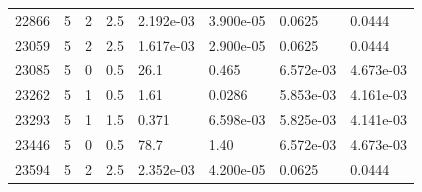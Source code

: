 \documentclass[preview]{standalone}
\begin{document}
{{{{\begin{tabular}{L{1.2cm}C{1.2cm} C{0.3cm}C{0.5cm} C{1.4cm}C{1.4cm} C{1.4cm}C{1.4cm}}
  22866  &     5  & 2     & 2.5 &  2.192e-03  & 3.900e-05  & 0.0625 &  0.0444   \\ 
  23059  &     5  & 2     & 2.5 &  1.617e-03  & 2.900e-05  & 0.0625 &  0.0444   \\ 
  23085  &     5  & 0     & 0.5 &  26.1  & 0.465  & 6.572e-03 &  4.673e-03   \\ 
  23262  &     5  & 1     & 0.5 &  1.61  & 0.0286  & 5.853e-03 &  4.161e-03   \\ 
  23293  &     5  & 1     & 1.5 &  0.371  & 6.598e-03  & 5.825e-03 &  4.141e-03   \\ 
  23446  &     5  & 0     & 0.5 &  78.7  & 1.40  & 6.572e-03 &  4.673e-03   \\ 
  23594  &     5  & 2     & 2.5 &  2.352e-03  & 4.200e-05  & 0.0625 &  0.0444   \\ 
\hline 
\end{tabular} 

}}}}
\end{document}
